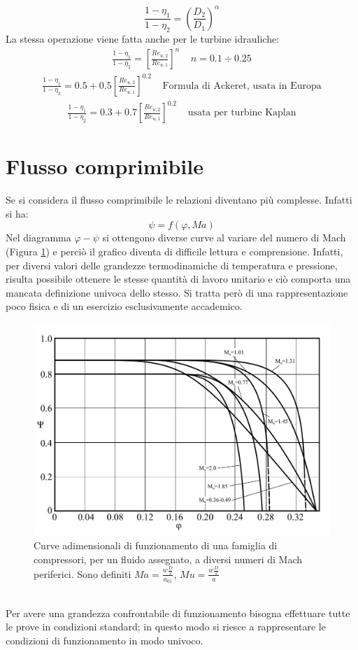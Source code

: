 \begin{equation}
\frac{1-\eta_1}{1-\eta_2} = \left( \frac{D_2}{D_1}\right)^\alpha
\end{equation}
La stessa operazione viene fatta anche per le turbine idrauliche:
\begin{align*}
\frac{1-\eta_1}{1-\eta_2} = \left[ \frac{Re_{u,2}}{Re_{u,1}} \right]^n \;\;\;\; n=0.1 \div 0.25
\end{align*}
\begin{align*}
\frac{1-\eta_1}{1-\eta_2} =0.5 + 0.5 \left[ \frac{Re_{u,2}}{Re_{u,1}} \right]^{0.2} \;\;\;\; \mbox{Formula di Ackeret, usata in Europa}
\end{align*}
\begin{align*}
\frac{1-\eta_1}{1-\eta_2} = 0.3 + 0.7 \left[ \frac{Re_{u,2}}{Re_{u,1}} \right]^{0.2} \;\;\;\; \mbox{usata per turbine Kaplan}
\end{align*}
\section{Flusso comprimibile}
Se si considera il flusso comprimibile le relazioni diventano più complesse. Infatti si ha:
\begin{equation}
\psi=f(\varphi,Ma)
\end{equation}
Nel diagramma $\varphi-\psi$ si ottengono diverse curve al variare del numero di Mach (Figura \ref{fig:ComprMach}) e perciò il grafico diventa di difficile lettura e comprensione. Infatti, per diversi valori delle grandezze termodinamiche di temperatura e pressione, risulta possibile ottenere le stesse quantità di lavoro unitario e ciò comporta una mancata definizione univoca dello stesso. Si tratta però di una rappresentazione poco fisica e di un esercizio esclusivamente accademico.
\begin{figure}[h!]
\centering
  \includegraphics[width=.85\textwidth]{fig/ComprMach.pdf}
\caption{Curve adimensionali di funzionamento di una famiglia di compressori, per un fluido assegnato, a diversi numeri di Mach periferici. Sono definiti $Ma = \frac{w \frac{D}{2}}{a_{01}}$, $Mu = \frac{w \frac{D}{2}}{a}$}
\label{fig:ComprMach}
\end{figure}
\\Per avere una grandezza confrontabile di funzionamento bisogna effettuare tutte le prove in condizioni standard; in questo modo si riesce a rappresentare le condizioni di funzionamento in modo univoco.

